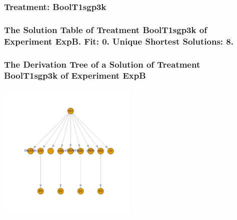 \documentclass[18pt,c]{beamer}
\begin{document}
 \begin{frame}
 \fontsize{8pt}{9pt}\selectfont
 \frametitle{ Treatment: BoolT1sgp3k }

 \label{ExpBStatsTable013.tex}  
 \end{frame}

 \begin{frame}
 \fontsize{8pt}{9pt}\selectfont
 \frametitle{ The Solution Table of Treatment BoolT1sgp3k of Experiment ExpB. Fit: 0. Unique Shortest Solutions: 8. }

 \label{ExpBSolutionTable006.tex}  
 \end{frame}

 \begin{frame}
 \frametitle{ The Derivation Tree of a Solution of Treatment BoolT1sgp3k of Experiment ExpB }
 \begin{center}
\includegraphics[width=0.5\textwidth, angle=0]
{ExpBDerivationTreeFigure006.pdf}
 \end{center}
 \label{report/ExpBDerivationTreeFigure006.pdf}  
 \end{frame}
\end{document}
